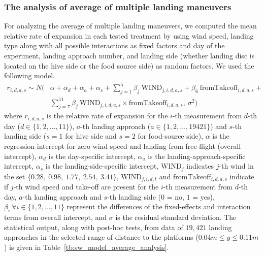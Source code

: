 \subsubsection{The analysis of average of multiple landing maneuvers}
For analyzing the average of multiple landing maneuvers, we computed the mean relative rate of expansion in each tested treatment by using wind speed, landing type along with all possible interactions as fixed factors and day of the experiment, landing approach number, and landing side (whether landing disc is located on the hive side or the food source side) as random factors. We used the following model.
\begin{equation}
	\label{eq:sw_model_average_analysis}
	\begin{array}{lll}
		r_{i,d,a,s} \sim N(\!\!\!\!\!
		& \alpha + \alpha_d + \alpha_a + \alpha_s + \sum_{j=1}^{5} \beta_j~\textrm{WIND}_{j,i,d,a,s} + 
		 \beta_6~\textrm{fromTakeoff}_{i,d,a,s}  + \\
		& \sum_{j=7}^{11} \beta_j~\textrm{WIND}_{j,i,d,a,s} \times \textrm{fromTakeoff}_{i,d,a,s},~\sigma^2)
	\end{array}
\end{equation}
where $r_{i,d,a,s}$ is the relative rate of expansion for the $i$-th measurement from $d$-th day (\(d \in \{1,2,\ldots,11\} \)), $a$-th landing approach (\(a \in \{1,2,\ldots,19421\} \)) and $s$-th landing side ($s=1$ for hive side and $s=2$ for food-source side), $\alpha$ is the regression intercept for zero wind speed and landing from free-flight (overall intercept), $\alpha_d$ is the day-specific intercept, $\alpha_a$ is the landing-approach-specific intercept, $\alpha_s$ is the landing-side-specific intercept, $\textrm{WIND}_j$ indicates $j$-th wind in the set $\{0.28,~0.98,~1.77,~2.54,~3.41\}$, $\textrm{WIND}_{j,i,d,t}$ and  $\textrm{fromTakeoff}_{i,d,a,s}$ indicate if $j$-th wind speed and take-off are present for the $i$-th measurement from $d$-th day, $a$-th landing approach and $s$-th landing side ($0$ = no, $1$ = yes), $\beta_i~\forall i \in \{1,2,\ldots,11\}$ represent the differences of the fixed-effects and interaction terms from overall intercept, and $\sigma$ is the residual standard deviation. The statistical output, along with post-hoc tests, from data of $19,421$ landing approaches in the selected range of distance to the platforms ($0.04m\leq y \leq 0.11m$) is given in Table~\ref{tb:sw_model_average_analysis}. 

